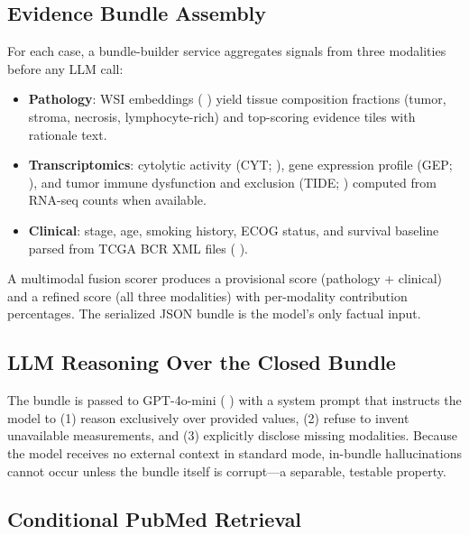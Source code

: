 \documentclass[11pt]{article}
\begin{document}
\subsection{Evidence Bundle Assembly}

For each case, a bundle-builder service aggregates signals from three modalities before any LLM call:

\begin{itemize}
  \setlength\itemsep{1pt}
  \item \textbf{Pathology}: WSI embeddings (\citeauthor{chen2022hipt} \citeyear{chen2022hipt}) yield tissue composition fractions (tumor, stroma, necrosis, lymphocyte-rich) and top-scoring evidence tiles with rationale text.
  \item \textbf{Transcriptomics}: cytolytic activity (CYT; \citeauthor{rooney2015molecular} \citeyear{rooney2015molecular}), gene expression profile (GEP; \citeauthor{ayers2017ifng} \citeyear{ayers2017ifng}), and tumor immune dysfunction and exclusion (TIDE; \citeauthor{jiang2018signatures} \citeyear{jiang2018signatures}) computed from RNA-seq counts when available.
  \item \textbf{Clinical}: stage, age, smoking history, ECOG status, and survival baseline parsed from TCGA BCR XML files (\citeauthor{tcga2014luad} \citeyear{tcga2014luad}).
\end{itemize}

A multimodal fusion scorer produces a provisional score (pathology + clinical) and a refined score (all three modalities) with per-modality contribution percentages. The serialized JSON bundle is the model's only factual input.

\subsection{LLM Reasoning Over the Closed Bundle}

The bundle is passed to GPT-4o-mini (\citeauthor{openai2024gpt4o} \citeyear{openai2024gpt4o}) with a system prompt that instructs the model to (1) reason exclusively over provided values, (2) refuse to invent unavailable measurements, and (3) explicitly disclose missing modalities. Because the model receives no external context in standard mode, in-bundle hallucinations cannot occur unless the bundle itself is corrupt—a separable, testable property.

\subsection{Conditional PubMed Retrieval}
\end{document}
